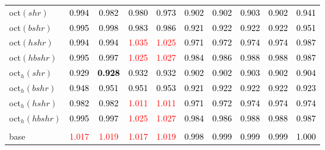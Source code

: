 \begin{tabular}[t]{l|ccccccccc}
oct$(shr)$ & \textcolor{black}{0.994} & \textcolor{black}{0.982} & \textcolor{black}{0.980} & \textcolor{black}{0.973} & \textcolor{black}{0.902} & \textcolor{black}{0.902} & \textcolor{black}{0.903} & \textcolor{black}{0.902} & \textcolor{black}{0.941}\\
oct$(bshr)$ & \textcolor{black}{0.995} & \textcolor{black}{0.998} & \textcolor{black}{0.983} & \textcolor{black}{0.986} & \textcolor{black}{0.921} & \textcolor{black}{0.922} & \textcolor{black}{0.922} & \textcolor{black}{0.922} & \textcolor{black}{0.951}\\
oct$(hshr)$ & \textcolor{black}{0.994} & \textcolor{black}{0.994} & \textcolor{red}{1.035} & \textcolor{red}{1.025} & \textcolor{black}{0.971} & \textcolor{black}{0.972} & \textcolor{black}{0.974} & \textcolor{black}{0.974} & \textcolor{black}{0.987}\\
oct$(hbshr)$ & \textcolor{black}{0.995} & \textcolor{black}{0.997} & \textcolor{red}{1.025} & \textcolor{red}{1.027} & \textcolor{black}{0.984} & \textcolor{black}{0.986} & \textcolor{black}{0.988} & \textcolor{black}{0.988} & \textcolor{black}{0.987}\\
oct$_h(shr)$ & \textcolor{black}{0.929} & \textcolor{black}{\textbf{0.928}} & \textcolor{black}{0.932} & \textcolor{black}{0.932} & \textcolor{black}{0.902} & \textcolor{black}{0.902} & \textcolor{black}{0.903} & \textcolor{black}{0.902} & \textcolor{black}{0.904}\\
oct$_h(bshr)$ & \textcolor{black}{0.948} & \textcolor{black}{0.951} & \textcolor{black}{0.951} & \textcolor{black}{0.953} & \textcolor{black}{0.921} & \textcolor{black}{0.922} & \textcolor{black}{0.922} & \textcolor{black}{0.922} & \textcolor{black}{0.923}\\
oct$_h(hshr)$ & \textcolor{black}{0.982} & \textcolor{black}{0.982} & \textcolor{red}{1.011} & \textcolor{red}{1.011} & \textcolor{black}{0.971} & \textcolor{black}{0.972} & \textcolor{black}{0.974} & \textcolor{black}{0.974} & \textcolor{black}{0.974}\\
oct$_h(hbshr)$ & \textcolor{black}{0.995} & \textcolor{black}{0.997} & \textcolor{red}{1.025} & \textcolor{red}{1.027} & \textcolor{black}{0.984} & \textcolor{black}{0.986} & \textcolor{black}{0.988} & \textcolor{black}{0.988} & \textcolor{black}{0.987}\\
\addlinespace[0.3em]
\multicolumn{10}{c}{\textbf{$k = 1$}}\\
base & \textcolor{red}{1.017} & \textcolor{red}{1.019} & \textcolor{red}{1.017} & \textcolor{red}{1.019} & \textcolor{black}{0.998} & \textcolor{black}{0.999} & \textcolor{black}{0.999} & \textcolor{black}{0.999} & \textcolor{black}{1.000}\\

\end{tabular}

